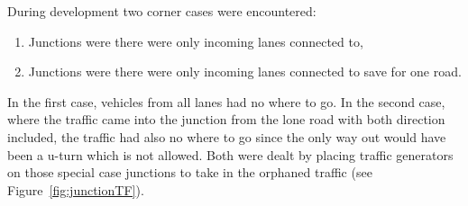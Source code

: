 During development two corner cases were encountered:
\begin{enumerate}
	\item Junctions were there were only incoming lanes connected to,
	\item Junctions were there were only incoming lanes connected to save for one road.
\end{enumerate}

In the first case, vehicles from all lanes had no where to go. In the second case, where the traffic came into the junction from the lone road with both direction included, the traffic had also no where to go since the only way out would have been a u-turn which is not allowed.
Both were dealt by placing traffic generators on those special case junctions to take in the orphaned traffic (see Figure~\ref{fig:junctionTF}).

